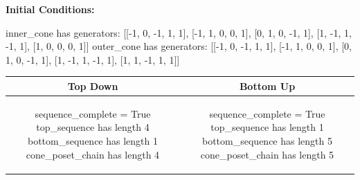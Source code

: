 \documentclass[10pt]{article}
\begin{document}
\textbf{Initial Conditions:}
\begin{SAGE}
inner_cone has generators: 
[[-1, 0, -1, 1, 1], [-1, 1, 0, 0, 1], [0, 1, 0, -1, 1], [1, -1, 1, -1, 1], [1, 0, 0, 0, 1]]
outer_cone has generators: 
[[-1, 0, -1, 1, 1], [-1, 1, 0, 0, 1], [0, 1, 0, -1, 1], [1, -1, 1, -1, 1], [1, 1, -1, 1, 1]]

\end{SAGE}
\begin{tabular}{c|c}
\textbf{Top Down} & \textbf{Bottom Up} \\ \hline  
\begin{SAGE}
sequence_complete = True
top_sequence has length 4
bottom_sequence has length 1
cone_poset_chain has length 4
\end{SAGE} 
&
\begin{SAGE}
sequence_complete = True
top_sequence has length 1
bottom_sequence has length 5
cone_poset_chain has length 5
\end{SAGE} 
\\ \hline


\end{tabular}
\end{document}
